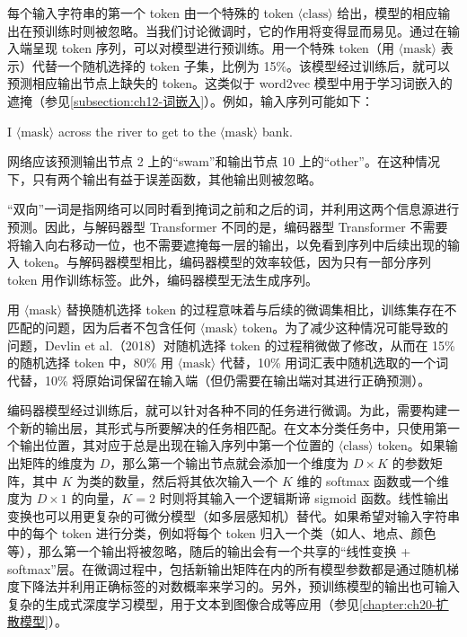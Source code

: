 \documentclass[../../main.tex]{subfiles}
\begin{document}
每个输入字符串的第一个 token 由一个特殊的 token $\langle\mathrm{class}\rangle$ 给出，模型的相应输出在预训练时则被忽略。当我们讨论微调时，它的作用将变得显而易见。通过在输入端呈现 token 序列，可以对模型进行预训练。用一个特殊 token（用 $\langle\mathrm{mask}\rangle$ 表示）代替一个随机选择的 token 子集，比例为 15\%。该模型经过训练后，就可以预测相应输出节点上缺失的 token。这类似于 word2vec 模型中用于学习词嵌入的遮掩（参见\cref{subsection:ch12-词嵌入}）。例如，输入序列可能如下：

\begin{center}
I $\langle\mathrm{mask}\rangle$ across the river to get to the $\langle\mathrm{mask}\rangle$ bank.
\end{center}

网络应该预测输出节点 2 上的“swam”和输出节点 10 上的“other”。在这种情况下，只有两个输出有益于误差函数，其他输出则被忽略。

“双向”一词是指网络可以同时看到掩词之前和之后的词，并利用这两个信息源进行预测。因此，与解码器型 Transformer 不同的是，编码器型 Transformer 不需要将输入向右移动一位，也不需要遮掩每一层的输出，以免看到序列中后续出现的输入 token。与解码器模型相比，编码器模型的效率较低，因为只有一部分序列 token 用作训练标签。此外，编码器模型无法生成序列。

用 $\langle\mathrm{mask}\rangle$ 替换随机选择 token 的过程意味着与后续的微调集相比，训练集存在不匹配的问题，因为后者不包含任何 $\langle\mathrm{mask}\rangle$ token。为了减少这种情况可能导致的问题，Devlin et al.（2018）对随机选择 token 的过程稍微做了修改，从而在 15\% 的随机选择 token 中，80\% 用 $\langle\mathrm{mask}\rangle$ 代替，10\% 用词汇表中随机选取的一个词代替，10\% 将原始词保留在输入端（但仍需要在输出端对其进行正确预测）。

编码器模型经过训练后，就可以针对各种不同的任务进行微调。为此，需要构建一个新的输出层，其形式与所要解决的任务相匹配。在文本分类任务中，只使用第一个输出位置，其对应于总是出现在输入序列中第一个位置的 $\langle\mathrm{class}\rangle$ token。如果输出矩阵的维度为 $D$，那么第一个输出节点就会添加一个维度为 $D\times K$ 的参数矩阵，其中 $K$ 为类的数量，然后将其依次输入一个 $K$ 维的 softmax 函数或一个维度为 $D\times1$ 的向量，$K=2$ 时则将其输入一个逻辑斯谛 sigmoid 函数。线性输出变换也可以用更复杂的可微分模型（如多层感知机）替代。如果希望对输入字符串中的每个 token 进行分类，例如将每个 token 归入一个类（如人、地点、颜色等），那么第一个输出将被忽略，随后的输出会有一个共享的“线性变换 + softmax”层。在微调过程中，包括新输出矩阵在内的所有模型参数都是通过随机梯度下降法并利用正确标签的对数概率来学习的。另外，预训练模型的输出也可输入复杂的生成式深度学习模型，用于文本到图像合成等应用（参见\cref{chapter:ch20-扩散模型}）。
\end{document}

